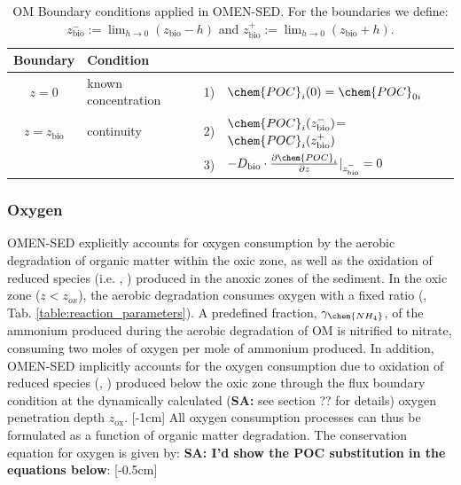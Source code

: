 \documentclass[gmd, manuscript]{copernicus}
\begin{document}
\begin{table}[tbp]
\caption{OM Boundary conditions applied in OMEN-SED. For the boundaries we define:  $z_{\mathrm{bio}}^- := \lim_{h\to0} (z_{\mathrm{bio}}-h)$ and $z_{\mathrm{bio}}^+ := \lim_{h\to0} (z_{\mathrm{bio}}+h)$.}
\centering
\begin{tabular}{ |c| l| c l|}
\hline
\textbf{Boundary}& \textbf{Condition}& &\\
\hline
$z=0$& known concentration& 1)& $\chem{POC}_i(0)=\chem{POC}_{0i}$\\
$z=z_{\mathrm{bio}}$&continuity& 2)& $\chem{POC}_i(z_{\mathrm{bio}}^-)$=$\chem{POC}_i(z_{\mathrm{bio}}^+)$\\
               &&3)&$-D_{\mathrm{bio}}\cdot \frac{\partial \chem{POC}_i}{\partial z}|_{z_{\mathrm{bio}}^-}=0$\\
\hline
\end{tabular}
\label{Tab:BC_OM}
\end{table}


\subsubsection{Oxygen}\label{subsubsec:O2}
OMEN-SED explicitly accounts for oxygen consumption by the aerobic degradation of organic matter within the oxic zone, as well as the oxidation of reduced species (i.e. , ) 
produced in the anoxic zones of the sediment. 
In the oxic zone ($z<z_{ox}$), the aerobic degradation consumes oxygen with a fixed  ratio (, Tab. \ref{table:reaction_parameters}). 
A predefined fraction, $\gamma_\chem{NH_4}$, of the ammonium produced during the aerobic degradation of OM is nitrified to nitrate, consuming two moles of oxygen per mole of ammonium produced. 
In addition, OMEN-SED implicitly accounts for the oxygen consumption due to oxidation of reduced species (, ) produced below the oxic zone through the flux boundary condition at the dynamically calculated 
(\textbf{SA:} see section ?? for details) oxygen penetration depth $z_{\mathrm{ox}}$. 
[-1cm]%
All oxygen consumption processes can thus be formulated as a function of organic matter degradation. 
The conservation equation for oxygen is given by: \textbf{SA: I'd show the POC substitution in the equations below}:
[-0.5cm]%
\end{document}
